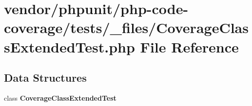 \section{vendor/phpunit/php-\/code-\/coverage/tests/\+\_\+files/\+Coverage\+Class\+Extended\+Test.php File Reference}
\label{php-code-coverage_2tests_2__files_2_coverage_class_extended_test_8php}
\subsection*{Data Structures}
\begin{DoxyCompactItemize}
\item 
class {\bf Coverage\+Class\+Extended\+Test}
\end{DoxyCompactItemize}
